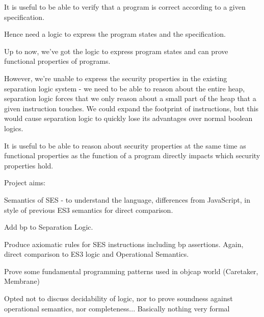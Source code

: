\documentclass[a4paper,notitlepage]{report}
\begin{document}
  It is useful to be able to verify that a program is correct according to a
  given specification.

  Hence need a logic to express the program states and the specification.

  Up to now, we've got the logic to express program states and can prove
  functional properties of programs.

  However, we're unable to express the security properties in the existing
  separation logic system - we need to be able to reason about the entire heap,
  separation logic forces that we only reason about a small part of the heap
  that a given instruction touches. We could expand the footprint of
  instructions, but this would cause separation logic to quickly lose its
  advantages over normal boolean logics.

  It is useful to be able to reason about security properties at the same time
  as functional properties as the function of a program directly impacts which
  security properties hold.


  Project aims:

  Semantics of SES - to understand the language, differences from JavaScript, in
  style of previous ES3 semantics for direct comparison.

  Add bp to Separation Logic.

  Produce axiomatic rules for SES instructions including bp assertions. Again,
  direct comparison to ES3 logic and Operational Semantics.

  Prove some fundamental programming patterns used in objcap world (Caretaker,
  Membrane)

  Opted not to discuss decidability of logic, nor to prove soundness against
  operational semantics, nor completeness... Basically nothing very formal
  \FIXME{}


\end{document}
